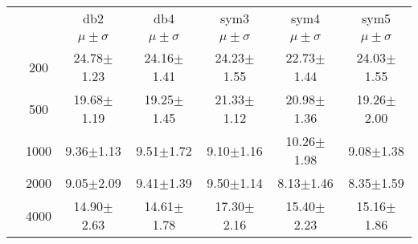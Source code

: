 \begin{table}[H]
\begin{tabular}{|c|c|c c c c c|}
\multicolumn{2}{c|}{}  & db2 & db4 & sym3 & sym4 & sym5 \\\cline{3-7}
\multicolumn{2}{c|}{}& $\mu \pm \sigma$ & $\mu \pm \sigma$ & $\mu \pm \sigma$ & $\mu \pm \sigma$ & $\mu \pm \sigma$ \\\hline

\multicolumn{1}{|c|}{ \multirow{5}{*}{\rotatebox[origin=c]{90}{\textbf{Neurônios}}} }
&200	&24.78$\pm$1.23	&24.16$\pm$1.41	&24.23$\pm$1.55	&22.73$\pm$1.44	&24.03$\pm$1.55	\\\cline{2-7}
&500	&19.68$\pm$1.19	&19.25$\pm$1.45	&21.33$\pm$1.12	&20.98$\pm$1.36	&19.26$\pm$2.00	\\\cline{2-7}
&1000	&9.36$\pm$1.13	&9.51$\pm$1.72	&9.10$\pm$1.16	&10.26$\pm$1.98	&9.08$\pm$1.38	\\\cline{2-7}
&2000	&9.05$\pm$2.09	&9.41$\pm$1.39	&9.50$\pm$1.14	&8.13$\pm$1.46	&8.35$\pm$1.59	\\\cline{2-7}
&4000	&14.90$\pm$2.63	&14.61$\pm$1.78	&17.30$\pm$2.16	&15.40$\pm$2.23	&15.16$\pm$1.86	

\\\midrule
	\end{tabular}

\end{table}

